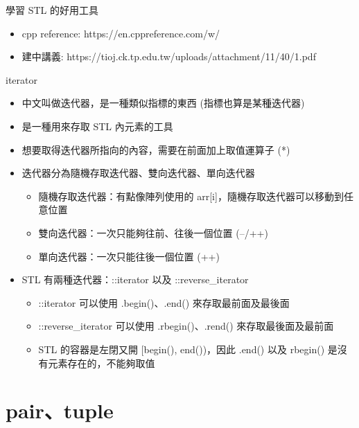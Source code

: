\documentclass[aspectratio=169]{beamer}
\begin{document}
    \begin{frame}{學習 STL 的好用工具}
        \begin{itemize}
            \item cpp reference: https://en.cppreference.com/w/
            \item 建中講義: https://tioj.ck.tp.edu.tw/uploads/attachment/11/40/1.pdf
        \end{itemize}

    \end{frame}

    \begin{frame}{iterator}
        \begin{itemize}
            \item<1-> 中文叫做迭代器，是一種類似指標的東西 (指標也算是某種迭代器)
            \item<1-> 是一種用來存取 STL 內元素的工具
            \item<2-> 想要取得迭代器所指向的內容，需要在前面加上取值運算子 (*)
            \item<3-> 迭代器分為隨機存取迭代器、雙向迭代器、單向迭代器
                \begin{itemize}
                    \item<4-> 隨機存取迭代器：有點像陣列使用的 arr[i]，隨機存取迭代器可以移動到任意位置
                    \item<5-> 雙向迭代器：一次只能夠往前、往後一個位置 (--/++)
                    \item<5-> 單向迭代器：一次只能往後一個位置 (++)
                \end{itemize}
            \item<6-> STL 有兩種迭代器：::iterator 以及 ::reverse\_iterator
                \begin{itemize}
                    \item<7-> ::iterator 可以使用 .begin()、.end() 來存取最前面及最後面
                    \item<7-> ::reverse\_iterator 可以使用 .rbegin()、.rend() 來存取最後面及最前面
                    \item<8-> STL 的容器是左閉又開 [begin(), end())，因此 .end() 以及 rbegin() 是沒有元素存在的，不能夠取值
                \end{itemize}
        \end{itemize}
    \end{frame}

    \section{pair、tuple}
\end{document}
